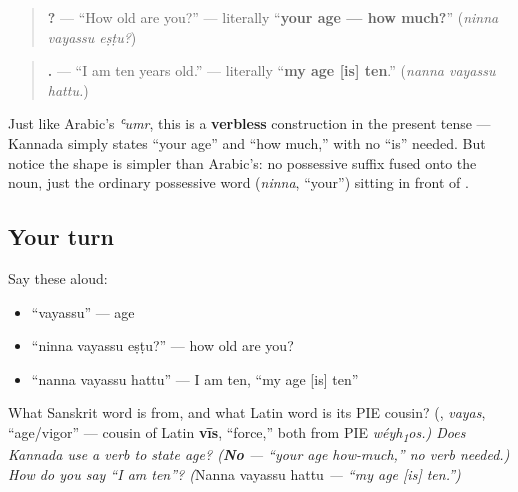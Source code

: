 \begin{grammarlens}[title={Grammar Lens: a simple possessive, no verb}]
\begin{quote}
\textbf{  ?} — \textquotedblleft{}How old are you?\textquotedblright{} — literally \textquotedblleft{}\textbf{your age — how much?}\textquotedblright{} (\emph{ninna vayassu eṣṭu?})
\end{quote}

\begin{quote}
\textbf{  .} — \textquotedblleft{}I am ten years old.\textquotedblright{} — literally \textquotedblleft{}\textbf{my age {[}is{]} ten}.\textquotedblright{} (\emph{nanna vayassu hattu.})
\end{quote}

Just like Arabic's \emph{ʿumr}, this is a \textbf{verbless} construction in the present tense — Kannada simply states \textquotedblleft{}your age\textquotedblright{} and \textquotedblleft{}how much,\textquotedblright{} with no \textquotedblleft{}is\textquotedblright{} needed. But notice the shape is simpler than Arabic's: no possessive suffix fused onto the noun, just the ordinary possessive word \textbf{} (\emph{ninna}, \textquotedblleft{}your\textquotedblright{}) sitting in front of \textbf{}.
\end{grammarlens}

\subsection*{Your turn}
Say these aloud:

\begin{itemize}
\raggedright
  \item \textquotedblleft{}vayassu\textquotedblright{} — age
  \item \textquotedblleft{}ninna vayassu eṣṭu?\textquotedblright{} — how old are you?
  \item \textquotedblleft{}nanna vayassu hattu\textquotedblright{} — I am ten, \textquotedblleft{}my age {[}is{]} ten\textquotedblright{}
\end{itemize}

\begin{tcolorbox}[breakable,colback=teal!4,colframe=teal!35!black,title={Before you move on}]
What Sanskrit word is \textbf{} from, and what Latin word is its PIE cousin? (\textbf{}, \emph{vayas}, \textquotedblleft{}age/vigor\textquotedblright{} — cousin of Latin \textbf{vīs}, \textquotedblleft{}force,\textquotedblright{} both from PIE \emph{wéyh\textsubscript{1}os.) Does Kannada use a verb to state age? (\textbf{No} — \textquotedblleft{}your age how-much,\textquotedblright{} no verb needed.) How do you say \textquotedblleft{}I am ten\textquotedblright{}? (}Nanna vayassu hattu\emph{ — \textquotedblleft{}my age {[}is{]} ten.\textquotedblright{})}
\end{tcolorbox}
